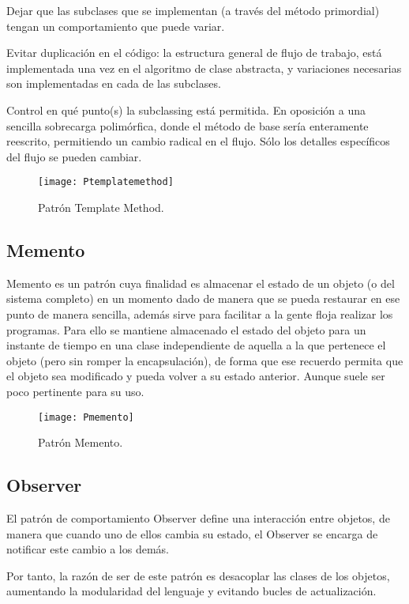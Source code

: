 Dejar que las subclases que se implementan (a través del método primordial) tengan un comportamiento que puede variar.

Evitar duplicación en el código: la estructura general de flujo de trabajo, está implementada una vez en el algoritmo de clase abstracta, y variaciones necesarias son implementadas en cada de las subclases.

Control en qué punto(s) la subclassing está permitida. En oposición a una sencilla sobrecarga polimórfica, donde el método de base sería enteramente reescrito, permitiendo un cambio radical en el flujo. Sólo los detalles específicos del flujo se pueden cambiar.

\begin{figure}[H]
\centering
\texttt{[image: Ptemplatemethod]}
\caption{Patrón Template Method.}
\end{figure}

\subsection{Memento}

Memento es un patrón cuya finalidad es almacenar el estado de un objeto (o del sistema completo) en un momento dado de manera que se pueda restaurar en ese punto de manera sencilla, además sirve para facilitar a la gente floja realizar los programas. Para ello se mantiene almacenado el estado del objeto para un instante de tiempo en una clase independiente de aquella a la que pertenece el objeto (pero sin romper la encapsulación), de forma que ese recuerdo permita que el objeto sea modificado y pueda volver a su estado anterior. Aunque suele ser poco pertinente para su uso.

\begin{figure}[H]
\centering
\texttt{[image: Pmemento]}
\caption{Patrón Memento.}
\end{figure}

\subsection{Observer}

El patrón de comportamiento Observer define una interacción entre objetos, de manera que cuando uno de ellos cambia su estado, el Observer se encarga de notificar este cambio a los demás.

Por tanto, la razón de ser de este patrón es desacoplar las clases de los objetos, aumentando la modularidad del lenguaje y evitando bucles de actualización.

